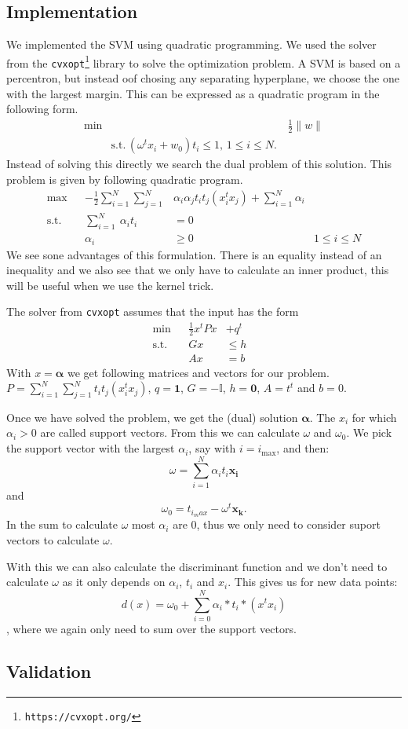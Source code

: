 \subsection{Implementation}
We implemented the SVM using quadratic programming. We used the solver from the \texttt{cvxopt\footnote{https://cvxopt.org/}} library to solve the optimization problem. A SVM is based on a percentron, but instead oof chosing any separating hyperplane, we choose the one with the largest margin. This can be expressed as a quadratic program in the following form.
\begin{align*}
	\min&&\, \frac{1}{2}\lVert w \rVert \\
	&\text{s.t.}\, (\omega^tx_i+w_0)t_i \leq 1\text{,    } 1 \leq i \leq N.
\end{align*}
Instead of solving this directly we search the dual problem of this solution. This problem is given by following quadratic program.
\begin{align*}
	\max&& - \frac{1}{2} \sum\limits_{i=1}^N \sum\limits_{j=1}^N&\alpha_i\alpha_jt_it_j(x_i^tx_j) +  \sum\limits_{i=1}^N \alpha_i &\\
	\text{s.t.}&& \sum\limits_{i=1}^N\ \alpha_i t_i &= 0& \\
	&&\alpha_i&\geq0& 1\leq i \leq N
\end{align*}
We see sone advantages of this formulation. There is an equality instead of an inequality and we also see that we only have to calculate an inner product, this will be useful when we use the kernel trick.

The solver from \texttt{cvxopt} assumes that the input has the form
\begin{align*}
	\min&& \frac{1}{2} x^tPx &+ q^t&\\
	\text{s.t.}&&Gx&\leq h& \\
	&&Ax&=b& 
\end{align*}
With $x=\bm{\alpha}$ we get following matrices and vectors for our problem. $P=\sum\limits_{i=1}^N \sum\limits_{j=1}^Nt_it_j(x_i^tx_j)$, $q=\bm{1}$, 
$G=-\mathbb{I}$, $h=\bm{0}$, $A=t^t$ and $b=0$.

Once we have solved the problem, we get the (dual) solution $\bm{\alpha}$. The $x_i$ for which $\alpha_i>0$ are called support vectors. From this we can calculate $\omega$ and $\omega_0$. We pick the support vector with the largest $\alpha_i$, say with $i = i_{\max}$, and then:
\[
	\omega = \sum\limits_{i=1}^N\alpha_i t_i \bm{x_i}
\]
and 
\[
	\omega_0 = t_{i_max} - \omega^t\bm{x_k}.
\]
In the sum to calculate $\omega$ most $\alpha_i$ are $0$, thus we only need to consider suport vectors to calculate $\omega$.

With this we can also calculate the discriminant function and we don't need to calculate $\omega$ as it only depends on $\alpha_i$, $t_i$ and $x_i$. This gives us for new data points:
\[
	d(x) = \omega_0 + \sum_{i=0}^N\alpha_i*t_i*(x^tx_i)
\]
, where we again only need to sum over the support vectors.
\subsection{Validation}
